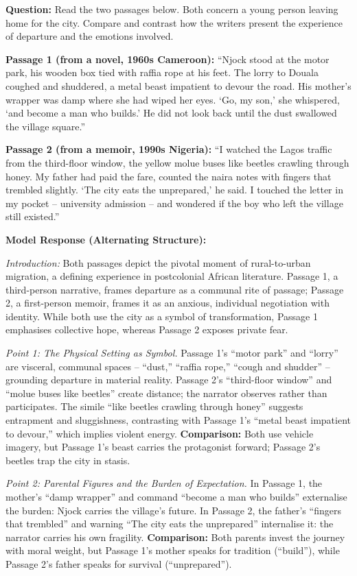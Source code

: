 \documentclass[11pt]{article}
\begin{document}
\begin{exoresolu}
\textbf{Question:} Read the two passages below. Both concern a young person leaving home for the city. Compare and contrast how the writers present the experience of departure and the emotions involved.

\textbf{Passage 1 (from a novel, 1960s Cameroon):} 
``Njock stood at the motor park, his wooden box tied with raffia rope at his feet. The lorry to Douala coughed and shuddered, a metal beast impatient to devour the road. His mother's wrapper was damp where she had wiped her eyes. `Go, my son,' she whispered, `and become a man who builds.' He did not look back until the dust swallowed the village square.''

\textbf{Passage 2 (from a memoir, 1990s Nigeria):} 
``I watched the Lagos traffic from the third-floor window, the yellow molue buses like beetles crawling through honey. My father had paid the fare, counted the naira notes with fingers that trembled slightly. `The city eats the unprepared,' he said. I touched the letter in my pocket -- university admission -- and wondered if the boy who left the village still existed.''

\textbf{Model Response (Alternating Structure):}

\textit{Introduction:} Both passages depict the pivotal moment of rural-to-urban migration, a defining experience in postcolonial African literature. Passage 1, a third-person narrative, frames departure as a communal rite of passage; Passage 2, a first-person memoir, frames it as an anxious, individual negotiation with identity. While both use the city as a symbol of transformation, Passage 1 emphasises collective hope, whereas Passage 2 exposes private fear.

\textit{Point 1: The Physical Setting as Symbol.} Passage 1's ``motor park'' and ``lorry'' are visceral, communal spaces -- ``dust,'' ``raffia rope,'' ``cough and shudder'' -- grounding departure in material reality. Passage 2's ``third-floor window'' and ``molue buses like beetles'' create distance; the narrator observes rather than participates. The simile ``like beetles crawling through honey'' suggests entrapment and sluggishness, contrasting with Passage 1's ``metal beast impatient to devour,'' which implies violent energy. \textbf{Comparison:} Both use vehicle imagery, but Passage 1's beast carries the protagonist forward; Passage 2's beetles trap the city in stasis.

\textit{Point 2: Parental Figures and the Burden of Expectation.} In Passage 1, the mother's ``damp wrapper'' and command ``become a man who builds'' externalise the burden: Njock carries the village's future. In Passage 2, the father's ``fingers that trembled'' and warning ``The city eats the unprepared'' internalise it: the narrator carries his own fragility. \textbf{Comparison:} Both parents invest the journey with moral weight, but Passage 1's mother speaks for tradition (``build''), while Passage 2's father speaks for survival (``unprepared'').


\end{exoresolu}
\end{document}
